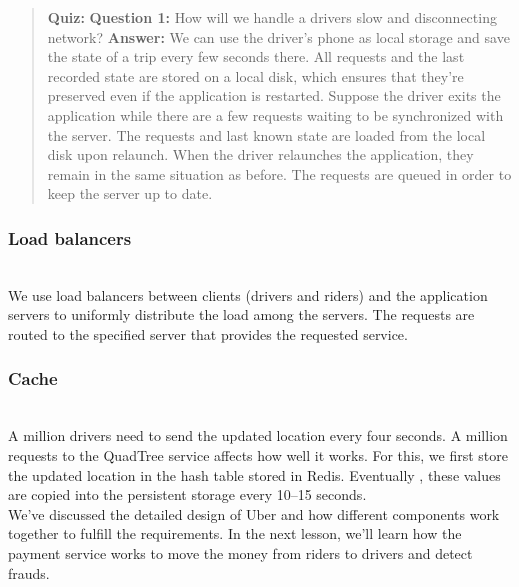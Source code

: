 \begin{quote}
\textbf{Quiz:}
\textbf{Question 1:} How will we handle a driver\textquotesingle s slow and disconnecting network?
\textbf{Answer:} We can use the driver's phone as local storage and save the state of a trip every few seconds there. All requests and the last recorded state are stored on a local disk, which ensures that they're preserved even if the application is restarted. Suppose the driver exits the application while there are a few requests waiting to be synchronized with the server. The requests and last known state are loaded from the local disk upon relaunch. When the driver relaunches the application, they remain in the same situation as before. The requests are queued in order to keep the server up to date.
\end{quote}

\subsubsection{Load balancers}\label{B9XSXfnn4-WjpOEMrVI49}
\\
We use load balancers between clients (drivers and riders) and the application servers to uniformly distribute the load among the servers. The requests are routed to the specified server that provides the requested service.

\subsubsection{Cache}\label{f39daXdyf4lT6QN_uBE5z}
\\
A million drivers need to send the updated location every four seconds. A million requests to the QuadTree service affects how well it works. For this, we first store the updated location in the hash table stored in Redis. Eventually , these values are copied into the persistent storage every 10--15 seconds.
\\
We've discussed the detailed design of Uber and how different components work together to fulfill the requirements. In the next lesson, we'll learn how the payment service works to move the money from riders to drivers and detect frauds.

